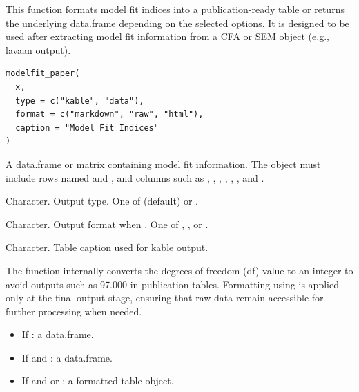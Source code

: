 \documentclass[a4paper]{book}
\begin{document}
%
\begin{Description}
This function formats model fit indices into a publication-ready table
or returns the underlying data.frame depending on the selected options.
It is designed to be used after extracting model fit information
from a CFA or SEM object (e.g., lavaan output).
\end{Description}
%
\begin{Usage}
\begin{verbatim}
modelfit_paper(
  x,
  type = c("kable", "data"),
  format = c("markdown", "raw", "html"),
  caption = "Model Fit Indices"
)
\end{verbatim}
\end{Usage}
%
\begin{Arguments}
\begin{ldescription}
\item[\code{x}] A data.frame or matrix containing model fit information.
The object must include rows named  and ,
and columns such as , , ,
, , , and .

\item[\code{type}] Character. Output type.
One of  (default) or .

\item[\code{format}] Character. Output format when .
One of , , or .

\item[\code{caption}] Character. Table caption used for kable output.
\end{ldescription}
\end{Arguments}
%
\begin{Details}
The function internally converts the degrees of freedom (df) value
to an integer to avoid outputs such as 97.000 in publication tables.
Formatting using  is applied only at the final
output stage, ensuring that raw data remain accessible for further
processing when needed.
\end{Details}
%
\begin{Value}
\begin{itemize}

\item{} If : a data.frame.
\item{} If  and : a data.frame.
\item{} If  and  or
: a formatted table object.

\end{itemize}

\end{Value}
\end{document}
